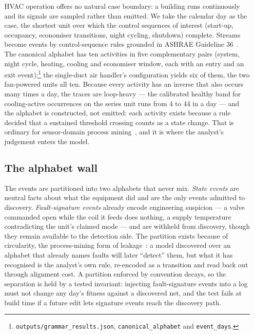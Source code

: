 \documentclass[runningheads]{llncs}
\begin{document}
HVAC operation offers no natural case boundary: a building runs continuously and its signals are sampled rather than emitted. We take the calendar day as the case, the shortest unit over which the control sequences of interest (start-up, occupancy, economiser transitions, night cycling, shutdown) complete. Streams become events by control-sequence rules grounded in ASHRAE Guideline 36~\cite{janssen2021sensoreventlog}. The canonical alphabet has ten activities in five complementary pairs (system, night cycle, heating, cooling and economiser window, each with an entry and an exit event);\footnote{\texttt{outputs/grammar\_results.json}, \texttt{canonical\_alphabet} and \texttt{event\_days}.} the single-duct air handler's configuration yields six of them, the two fan-powered units all ten. Because every activity has an inverse that also occurs many times a day, the traces are loop-heavy --- the calibrated healthy band for cooling-active occurrences on the series unit runs from 4 to 44 in a day --- and the alphabet is constructed, not emitted: each activity exists because a rule decided that a sustained threshold crossing counts as a state change. That is ordinary for sensor-domain process mining~\cite{vanzelst2021eventabstraction}, and it is where the analyst's judgement enters the model.

\subsection{The alphabet wall}

The events are partitioned into two alphabets that never mix. \emph{State events} are neutral facts about what the equipment did and are the only events admitted to discovery. \emph{Fault-signature events} already encode engineering suspicion --- a valve commanded open while the coil it feeds does nothing, a supply temperature contradicting the unit's claimed mode --- and are withheld from discovery, though they remain available to the detection side. The partition exists because of circularity, the process-mining form of leakage~\cite{weytjens2022dataleakage}: a model discovered over an alphabet that already names faults will later ``detect'' them, but what it has recognised is the analyst's own rule, re-encoded as a transition and read back out through alignment cost. A partition enforced by convention decays, so the separation is held by a tested invariant: injecting fault-signature events into a log must not change any day's fitness against a discovered net, and the test fails at build time if a future edit lets signature events reach the discovery path.
\end{document}
